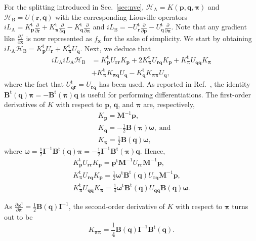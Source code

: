 \documentclass[
journal=jctcce,
layout=twocolumn
]{achemso}
\newcommand{\mt}[1]{\boldsymbol{\mathbf{#1}}}   %
\newcommand{\vt}[1]{\boldsymbol{\mathbf{#1}}}   %
\newcommand{\tr}[1]{#1^\text{t}}                %
\newcommand{\diff}[2]{\frac{\partial #1}{\partial #2}} %
\newcommand{\Ham}[1]{{\mathcal H}_\text{#1}}    %
\newcommand{\Liu}[1]{i\!L_\text{#1}}            %
\begin{document}
For the splitting introduced in Sec.~\ref{sec:nve}, $\Ham A = K(\vt p, \vt q, \vt \pi)$ and $\Ham B = U(\vt r, \vt q)$ with the corresponding Liouville operators $\Liu{A} = \tr{K_{\vt p}}\diff{}{\vt r} + \tr{K_{\vt \pi}}\diff{}{\vt q} - \tr{K_{\vt q}}\diff{}{\vt \pi}$ and $\Liu{B} = -\tr{U_{\vt r}}\diff{}{\vt p} - \tr{U_{\vt q}}\diff{}{\vt \pi}$.
Note that any gradient like $\diff{f}{\vt x}$ is now represented as $f_{\vt x}$ for the sake of simplicity.
We start by obtaining $\Liu A \Ham B = \tr{K_{\vt p}} U_{\vt r} + \tr{K_{\vt \pi}} U_{\vt q}$. Next, we deduce that
\begin{align*}
\Liu A \Liu A \Ham B &= \tr{K_{\vt p}} U_{\vt r \vt r} K_{\vt p}
+ 2 \tr{K_{\vt \pi}} U_{\vt r \vt q} K_{\vt p}
+ \tr{K_{\vt \pi}} U_{\vt q \vt q} K_{\vt \pi} \\
&+ \tr{K_{\vt \pi}} K_{\vt \pi \vt q} U_{\vt q}
- \tr{K_{\vt q}} K_{\vt \pi \vt \pi} U_{\vt q},
\end{align*}
where the fact that $\tr{U_{\vt q \vt r}} = U_{\vt r \vt q}$ has been used.
As reported in Ref.~, the identity $\tr{\mt B}(\vt q) {\vt \pi} = -\tr{\mt B}(\vt \pi) {\vt q}$ is useful for performing differentiations.
The first-order derivatives of $K$ with respect to $\vt p$, $\vt q$, and $\vt \pi$ are, respectively,
\begin{align*}
&K_{\vt p} = {\mt M}^{-1} {\vt p}, \\
&K_{\vt q} = -\frac{1}{2} {\mt B}(\vt \pi) {\vt \omega}, \; \text{and} \\
&K_{\vt \pi} = \frac{1}{2} {\mt B}(\vt q) {\vt \omega},
\end{align*}
where $\vt \omega = \frac{1}{2} {\mt I}^{-1} \tr{\mt B}(\vt q) \vt \pi = -\frac{1}{2} {\mt I}^{-1} \tr{\mt B}(\vt \pi) \vt q$.\cite{Silveira_2017} Hence,
\begin{gather*}
\tr{K_{\vt p}} U_{\vt r \vt r} K_{\vt p} = \tr{\vt p} {\mt M}^{-1} U_{\vt r \vt r} {\mt M}^{-1} {\vt p}, \\
\tr{K_{\vt \pi}} U_{\vt r \vt q} K_{\vt p} = \frac{1}{2} \tr{\vt \omega} \tr{\mt B}(\vt q) U_{\vt r \vt q} {\mt M}^{-1} {\vt p}, \\
\tr{K_{\vt \pi}} U_{\vt q \vt q} K_{\vt \pi} = \frac{1}{4} \tr{\vt \omega} \tr{\mt B}(\vt q) U_{\vt q \vt q} {\mt B}(\vt q) \vt \omega.
\end{gather*}

As $\diff{\tr{\vt \omega}}{\vt \pi} = \frac{1}{2} {\mt B}(\vt q) {\mt I}^{-1}$, the second-order derivative of $K$ with respect to $\vt \pi$ turns out to be
\begin{equation*}
K_{\vt \pi \vt \pi} = \frac{1}{4} {\mt B}(\vt q) {\mt I}^{-1} \tr{\mt B}(\vt q).
\end{equation*}
\end{document}
